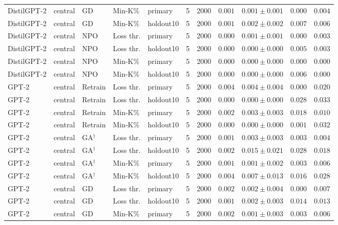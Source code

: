 \begin{table}[t]
\begin{tabular*}{\textwidth}{@{\extracolsep{\fill}}lllllcccccc@{}}
DistilGPT-2 & central & GD & Min-K\% & primary & 5 & 2000 & $0.001$ & $0.001 \pm 0.001$ & $0.000$ & $0.004$ \\
DistilGPT-2 & central & GD & Min-K\% & holdout10 & 5 & 2000 & $0.001$ & $0.002 \pm 0.002$ & $0.007$ & $0.006$ \\
DistilGPT-2 & central & NPO & Loss thr. & primary & 5 & 2000 & $0.000$ & $0.001 \pm 0.001$ & $0.000$ & $0.003$ \\
DistilGPT-2 & central & NPO & Loss thr. & holdout10 & 5 & 2000 & $0.000$ & $0.000 \pm 0.000$ & $0.005$ & $0.003$ \\
DistilGPT-2 & central & NPO & Min-K\% & primary & 5 & 2000 & $0.000$ & $0.000 \pm 0.000$ & $0.000$ & $0.000$ \\
DistilGPT-2 & central & NPO & Min-K\% & holdout10 & 5 & 2000 & $0.000$ & $0.000 \pm 0.000$ & $0.006$ & $0.000$ \\
GPT-2 & central & Retrain & Loss thr. & primary & 5 & 2000 & $0.004$ & $0.004 \pm 0.004$ & $0.000$ & $0.020$ \\
GPT-2 & central & Retrain & Loss thr. & holdout10 & 5 & 2000 & $0.000$ & $0.000 \pm 0.000$ & $0.028$ & $0.033$ \\
GPT-2 & central & Retrain & Min-K\% & primary & 5 & 2000 & $0.002$ & $0.003 \pm 0.003$ & $0.018$ & $0.010$ \\
GPT-2 & central & Retrain & Min-K\% & holdout10 & 5 & 2000 & $0.000$ & $0.000 \pm 0.000$ & $0.001$ & $0.032$ \\
GPT-2 & central & GA$^{\dagger}$ & Loss thr. & primary & 5 & 2000 & $0.001$ & $0.003 \pm 0.003$ & $0.003$ & $0.004$ \\
GPT-2 & central & GA$^{\dagger}$ & Loss thr. & holdout10 & 5 & 2000 & $0.002$ & $0.015 \pm 0.021$ & $0.028$ & $0.018$ \\
GPT-2 & central & GA$^{\dagger}$ & Min-K\% & primary & 5 & 2000 & $0.001$ & $0.001 \pm 0.002$ & $0.003$ & $0.006$ \\
GPT-2 & central & GA$^{\dagger}$ & Min-K\% & holdout10 & 5 & 2000 & $0.004$ & $0.007 \pm 0.013$ & $0.016$ & $0.028$ \\
GPT-2 & central & GD & Loss thr. & primary & 5 & 2000 & $0.002$ & $0.002 \pm 0.004$ & $0.000$ & $0.007$ \\
GPT-2 & central & GD & Loss thr. & holdout10 & 5 & 2000 & $0.001$ & $0.002 \pm 0.003$ & $0.014$ & $0.013$ \\
GPT-2 & central & GD & Min-K\% & primary & 5 & 2000 & $0.002$ & $0.001 \pm 0.003$ & $0.003$ & $0.006$ \\

\end{tabular*}
\end{table}
